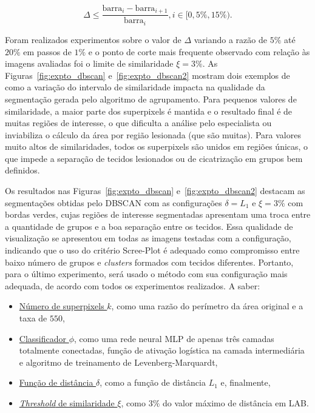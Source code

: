 \begin{equation}\label{eq:limBarra}
    \Delta \leq \frac{ \text{barra}_i - \text{barra}_{i+1}}{\text{barra}_i}, i \in [0,5\%, 15\%).
\end{equation}

Foram realizados experimentos sobre o valor de $\Delta$ variando a razão de $5\%$ até $20\%$ em passos de $1\%$ e o ponto de corte mais frequente observado com relação às imagens avaliadas foi o limite de similaridade $\xi = 3\%$.
As Figuras~\ref{fig:expto_dbscan} e~\ref{fig:expto_dbscan2} mostram dois exemplos de como a variação do intervalo de similaridade impacta na qualidade da segmentação gerada pelo algoritmo de agrupamento.
Para pequenos valores de similaridade, a maior parte dos superpixels é mantida e o resultado final é de muitas regiões de interesse, o que dificulta a análise pelo especialista ou inviabiliza o cálculo da área por região lesionada (que são muitas).
Para valores muito altos de similaridades, todos os superpixels são unidos em regiões únicas, o que impede a separação de tecidos lesionados ou de cicatrização em grupos bem definidos.

Os resultados nas Figuras~\ref{fig:expto_dbscan} e~\ref{fig:expto_dbscan2} destacam as segmentações obtidas pelo DBSCAN com as configurações $\delta = L_1$ e $\xi = 3\%$ com bordas verdes, cujas regiões de interesse segmentadas apresentam uma troca entre a quantidade de grupos e a boa separação entre os tecidos.
Essa qualidade de visualização se apresentou em todas as imagens testadas com a configuração, indicando que o uso do critério Scree-Plot é adequado como compromisso entre baixo número de grupos e \textit{clusters} formados com tecidos diferentes.
Portanto, para o último experimento, será usado o método \system com sua configuração mais adequada, de acordo com todos os experimentos realizados.
A saber:

\begin{itemize}
    \item \underline{Número de superpixels $k$}, como uma razão do perímetro da área original e a taxa de $550$,
    \item \underline{Classificador $\phi$}, como uma rede neural MLP de apenas três camadas totalmente conectadas, função de ativação logística na camada intermediária e algoritmo de treinamento de Levenberg-Marquardt,
    \item \underline{Função de distância $\delta$}, como a função de distância $L_1$ e, finalmente,
    \item \underline{\textit{Threshold} de similaridade $\xi$}, como $3\%$ do valor máximo de distância em LAB.
\end{itemize}


